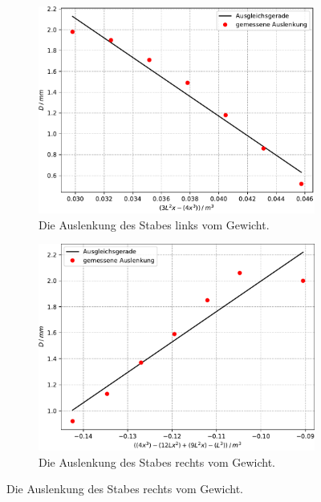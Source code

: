  

\begin{figure}
    \centering
    \caption{Beidseitige Einspannung des runden Stabes.}
    \begin{subfigure}{0.4\textwidth} 
       \includegraphics[scale=0.4]{content/data/plot_beidseitig_rund_links.pdf}
       \caption{Die Auslenkung des Stabes links vom Gewicht.}
       \label{fig:beid_links_rund}
    \end{subfigure}

    \begin{subfigure}{0.4\textwidth}
        \includegraphics[scale=0.4]{content/data/plot_beidseitig_rund_rechts.pdf}
        \caption{Die Auslenkung des Stabes rechts vom Gewicht.}
        \label{fig:beid_rechts_rund}
    \end{subfigure}
    \label{fig:beid_rund}
\end{figure}


